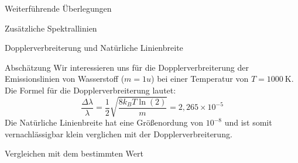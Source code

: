 \documentclass[pdftex, a4paper,11pt, twoside, ngerman]{report}
\begin{document}
  
  
  \begin{chapter}{Weiterführende Überlegungen}
    \label{chp:Weiterfuehrendes}
    
    
    
    \begin{section}{Zusätzliche Spektrallinien}
      \label{chp:Weiterfuehrendes:sec:Spektrallinien}
      
      
      
    \end{section}
    
    
    
    \begin{section}{Dopplerverbreiterung und Natürliche Linienbreite}
      \label{chp:Weiterfuehrendes:sec:Linienbreite}
      
      
      
      \begin{subsection}{Abschätzung}
        \label{chp:Weiterfuehrendes:sec:Linienbreite:subsec:Abschaetzung}
        Wir interessieren uns für die Dopplerverbreiterung der Emissionslinien 
        von Wasserstoff ($m=1u$) bei einer Temperatur von 
        $T=\SI{1000}{\kelvin}$. Die Formel für die Dopplerverbreiterung lautet:
        \[
          \frac{\Delta\lambda}{\lambda} = \frac 12\sqrt{\frac{8k_BT\ln(2)}{m}} 
          = 2,265\times10^{-5}
        \]
        Die Natürliche Linienbreite hat eine Größenordung von $10^{-8}$ und 
        ist somit vernachlässigbar klein verglichen mit der 
        Dopplerverbreiterung.
        
      \end{subsection}
      
      
      
      \begin{subsection}{Vergleichen mit dem bestimmten Wert}
        \label{chp:Weiterfuehrendes:sec:Linienbreite:subsec:Vergleiche}
        

\end{subsection}
\end{section}
\end{chapter}
\end{document}
